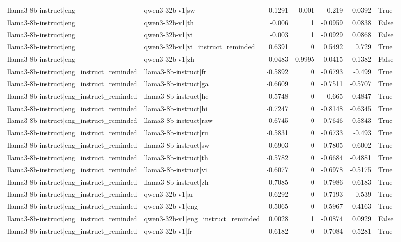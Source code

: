 \begin{table}
\begin{tabular}{l l r r r r l}
llama3-8b-instruct|eng & qwen3-32b-v1|sw & -0.1291 & 0.001 & -0.219 & -0.0392 & True \\
llama3-8b-instruct|eng & qwen3-32b-v1|th & -0.006 & 1 & -0.0959 & 0.0838 & False \\
llama3-8b-instruct|eng & qwen3-32b-v1|vi & -0.003 & 1 & -0.0929 & 0.0868 & False \\
llama3-8b-instruct|eng & qwen3-32b-v1|vi_instruct_reminded & 0.6391 & 0 & 0.5492 & 0.729 & True \\
llama3-8b-instruct|eng & qwen3-32b-v1|zh & 0.0483 & 0.9995 & -0.0415 & 0.1382 & False \\
llama3-8b-instruct|eng_instruct_reminded & llama3-8b-instruct|fr & -0.5892 & 0 & -0.6793 & -0.499 & True \\
llama3-8b-instruct|eng_instruct_reminded & llama3-8b-instruct|ga & -0.6609 & 0 & -0.7511 & -0.5707 & True \\
llama3-8b-instruct|eng_instruct_reminded & llama3-8b-instruct|he & -0.5748 & 0 & -0.665 & -0.4847 & True \\
llama3-8b-instruct|eng_instruct_reminded & llama3-8b-instruct|hi & -0.7247 & 0 & -0.8148 & -0.6345 & True \\
llama3-8b-instruct|eng_instruct_reminded & llama3-8b-instruct|raw & -0.6745 & 0 & -0.7646 & -0.5843 & True \\
llama3-8b-instruct|eng_instruct_reminded & llama3-8b-instruct|ru & -0.5831 & 0 & -0.6733 & -0.493 & True \\
llama3-8b-instruct|eng_instruct_reminded & llama3-8b-instruct|sw & -0.6903 & 0 & -0.7805 & -0.6002 & True \\
llama3-8b-instruct|eng_instruct_reminded & llama3-8b-instruct|th & -0.5782 & 0 & -0.6684 & -0.4881 & True \\
llama3-8b-instruct|eng_instruct_reminded & llama3-8b-instruct|vi & -0.6077 & 0 & -0.6978 & -0.5175 & True \\
llama3-8b-instruct|eng_instruct_reminded & llama3-8b-instruct|zh & -0.7085 & 0 & -0.7986 & -0.6183 & True \\
llama3-8b-instruct|eng_instruct_reminded & qwen3-32b-v1|ar & -0.6292 & 0 & -0.7193 & -0.539 & True \\
llama3-8b-instruct|eng_instruct_reminded & qwen3-32b-v1|eng & -0.5065 & 0 & -0.5967 & -0.4163 & True \\
llama3-8b-instruct|eng_instruct_reminded & qwen3-32b-v1|eng_instruct_reminded & 0.0028 & 1 & -0.0874 & 0.0929 & False \\
llama3-8b-instruct|eng_instruct_reminded & qwen3-32b-v1|fr & -0.6182 & 0 & -0.7084 & -0.5281 & True \\

\end{tabular}
\end{table}
